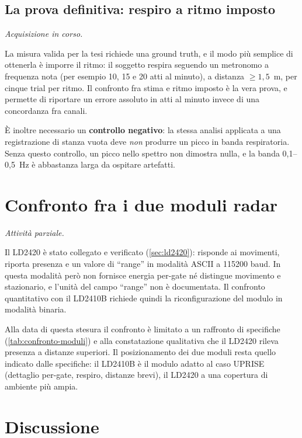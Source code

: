 \subsection{La prova definitiva: respiro a ritmo imposto}
\label{sec:respiro-metronomo}

\emph{Acquisizione in corso.}

La misura valida per la tesi richiede una ground truth, e il modo più semplice di
ottenerla è imporre il ritmo: il soggetto respira seguendo un metronomo a
frequenza nota (per esempio 10, 15 e 20 atti al minuto), a distanza $\geq 1{,}5$~m,
per cinque trial per ritmo. Il confronto fra stima e ritmo imposto è la vera prova,
e permette di riportare un errore assoluto in atti al minuto invece di una
concordanza fra canali.

È inoltre necessario un \textbf{controllo negativo}: la stessa analisi applicata a
una registrazione di stanza vuota deve \emph{non} produrre un picco in banda
respiratoria. Senza questo controllo, un picco nello spettro non dimostra nulla, e
la banda 0,1--0,5~Hz è abbastanza larga da ospitare artefatti.

\section{Confronto fra i due moduli radar}
\label{sec:ld2420-risultati}

\emph{Attività parziale.}

Il LD2420 è stato collegato e verificato (\cref{sec:ld2420}): risponde ai movimenti,
riporta presenza e un valore di ``range'' in modalità ASCII a 115200 baud. In questa
modalità però non fornisce energia per-gate né distingue movimento e stazionario, e
l'unità del campo ``range'' non è documentata. Il confronto quantitativo con il
LD2410B richiede quindi la riconfigurazione del modulo in modalità binaria.

Alla data di questa stesura il confronto è limitato a un raffronto di specifiche
(\cref{tab:confronto-moduli}) e alla constatazione qualitativa che il LD2420
rileva presenza a distanze superiori. Il posizionamento dei due moduli resta quello
indicato dalle specifiche: il LD2410B è il modulo adatto al caso UPRISE (dettaglio
per-gate, respiro, distanze brevi), il LD2420 a una copertura di ambiente più ampia.

\section{Discussione}
\label{sec:discussione}

